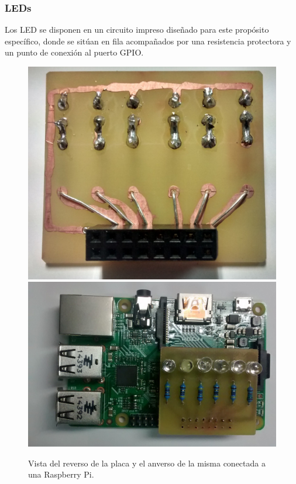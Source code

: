 \subsubsection{LEDs}

Los LED se disponen en un circuito impreso diseñado para este propósito específico, donde se sitúan en fila acompañados por una resistencia protectora y un punto de conexión al puerto GPIO.

\begin{figure}[H]
\centering
\includegraphics[height=0.2\textheight]{Chapters/Chapter5/Figures/estructuraFinal/pcb1}
\includegraphics[height=0.2\textheight]{Chapters/Chapter5/Figures/estructuraFinal/pcb2}
\caption{Vista del reverso de la placa y el anverso de la misma conectada a una Raspberry Pi.}
\end{figure}

